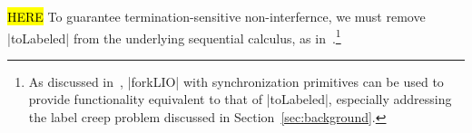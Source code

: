 \hl{HERE}
%
To guarantee termination-sensitive non-interfernce, we must remove |toLabeled|
from the underlying sequential calculus, as
in~\cite{stefan:addressing-covert}.\footnote{ As discussed
in~\cite{stefan:addressing-covert}, |forkLIO| with synchronization primitives
can be used to provide functionality equivalent to that of |toLabeled|,
especially addressing the label creep problem discussed in
Section~\ref{sec:background}.
}
%


